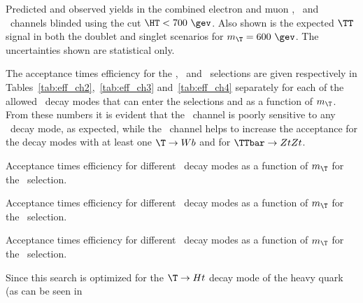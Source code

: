 \begin{table}[tb]\centering

\caption{Predicted and observed yields in the combined 
electron and muon \chii, \chiii\ and \chiv\ channels
blinded using the cut $\HT<700~\gev$. 
Also shown is the expected $\TT$ signal in both the doublet 
and singlet scenarios for $m_{\T}=600~\gev$. 
The uncertainties shown 
are 
statistical only.
\label{tab:Yields_blind}}
\end{table}


The acceptance  times efficiency for the \chii, \chiii\ and 
\chiv\ selections are given respectively in 
Tables~\ref{tab:eff_ch2},~\ref{tab:eff_ch3} and~\ref{tab:eff_ch4}
separately for each of the allowed \TTbar\ decay modes that can enter
the selections and as a function of $m_{\T}$.
From these numbers it is evident that the \chii\ channel is
poorly sensitive to any \T\ decay mode, as expected,
while the \chiii\ channel helps to increase the acceptance
for the decay modes with at least one $\T\to Wb$ and 
for $\TTbar \to ZtZt$.
\begin{table}[h!tb]
\begin{center}%

\caption{Acceptance times efficiency for different \TTbar\ decay modes as a function of $m_{\T}$ for the \chii\ selection.}
\label{tab:eff_ch2}
\end{center}
\begin{center}%

\caption{Acceptance times efficiency for different \TTbar\ decay modes as a function of $m_{\T}$ for the \chiii\ selection.}
\label{tab:eff_ch3}
\end{center}
\begin{center}%

\caption{Acceptance times efficiency for different \TTbar\ decay modes as a function of $m_{\T}$ for the \chiv\ selection.}
\label{tab:eff_ch4}
\end{center}
\end{table}
Since this search is optimized for the
$\T \to Ht$ decay mode of the heavy quark (as can be seen in
